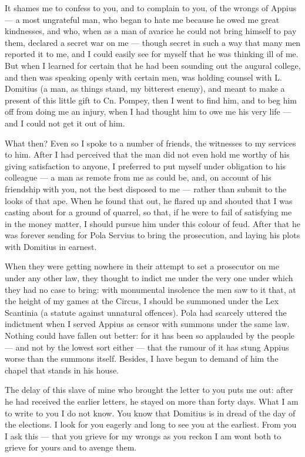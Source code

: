 

 It shames me to confess to you, and to complain to you, of the wrongs of Appius --- a most ungrateful man, who began to hate me because he owed me great kindnesses, and who, when as a man of avarice he could not bring himself to pay them, declared a secret war on me --- though secret in such a way that many men reported it to me, and I could easily see for myself that he was thinking ill of me. But when I learned for certain that he had been sounding out the augural college, and then was speaking openly with certain men, was holding counsel with L. Domitius (a man, as things stand, my bitterest enemy), and meant to make a present of this little gift to Cn. Pompey, then I went to find him, and to beg him off from doing me an injury, when I had thought him to owe me his very life --- and I could not get it out of him.

 What then? Even so I spoke to a number of friends, the witnesses to my services to him. After I had perceived that the man did not even hold me worthy of his giving satisfaction to anyone, I preferred to put myself under obligation to his colleague --- a man as remote from me as could be, and, on account of his friendship with you, not the best disposed to me --- rather than submit to the looks of that ape. When he found that out, he flared up and shouted that I was casting about for a ground of quarrel, so that, if he were to fail of satisfying me in the money matter, I should pursue him under this colour of feud. After that he was forever sending for Pola Servius to bring the prosecution, and laying his plots with Domitius in earnest.

 When they were getting nowhere in their attempt to set a prosecutor on me under any other law, they thought to indict me under the very one under which they had no case to bring: with monumental insolence the men saw to it that, at the height of my games at the Circus, I should be summoned under the Lex Scantinia (a statute against unnatural offences). Pola had scarcely uttered the indictment when I served Appius as censor with summons under the same law. Nothing could have fallen out better: for it has been so applauded by the people --- and not by the lowest sort either --- that the rumour of it has stung Appius worse than the summons itself. Besides, I have begun to demand of him the chapel that stands in his house.

 The delay of this slave of mine who brought the letter to you puts me out: after he had received the earlier letters, he stayed on more than forty days. What I am to write to you I do not know. You know that Domitius is in dread of the day of the elections. I look for you eagerly and long to see you at the earliest. From you I ask this --- that you grieve for my wrongs as you reckon I am wont both to grieve for yours and to avenge them.
